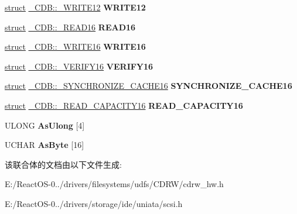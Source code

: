 \begin{DoxyCompactItemize}
\item 
\mbox{\label{union___c_d_b_a071f6d443af5e2df477b9142ffcf5545}} 
\hyperlink{interfacestruct}{struct} \hyperlink{struct___c_d_b_1_1___w_r_i_t_e12}{\+\_\+\+C\+D\+B\+::\+\_\+\+W\+R\+I\+T\+E12} {\bfseries W\+R\+I\+T\+E12}
\item 
\mbox{\label{union___c_d_b_afe8a3fa473179a065ae179190a4a9c5d}} 
\hyperlink{interfacestruct}{struct} \hyperlink{struct___c_d_b_1_1___r_e_a_d16}{\+\_\+\+C\+D\+B\+::\+\_\+\+R\+E\+A\+D16} {\bfseries R\+E\+A\+D16}
\item 
\mbox{\label{union___c_d_b_a0a8fa7a540f092dd2d0dcfbd810b7f6a}} 
\hyperlink{interfacestruct}{struct} \hyperlink{struct___c_d_b_1_1___w_r_i_t_e16}{\+\_\+\+C\+D\+B\+::\+\_\+\+W\+R\+I\+T\+E16} {\bfseries W\+R\+I\+T\+E16}
\item 
\mbox{\label{union___c_d_b_a0757143182e5d5281ce912935282b0e0}} 
\hyperlink{interfacestruct}{struct} \hyperlink{struct___c_d_b_1_1___v_e_r_i_f_y16}{\+\_\+\+C\+D\+B\+::\+\_\+\+V\+E\+R\+I\+F\+Y16} {\bfseries V\+E\+R\+I\+F\+Y16}
\item 
\mbox{\label{union___c_d_b_acc37e4e85c413db966c97a0553fea522}} 
\hyperlink{interfacestruct}{struct} \hyperlink{struct___c_d_b_1_1___s_y_n_c_h_r_o_n_i_z_e___c_a_c_h_e16}{\+\_\+\+C\+D\+B\+::\+\_\+\+S\+Y\+N\+C\+H\+R\+O\+N\+I\+Z\+E\+\_\+\+C\+A\+C\+H\+E16} {\bfseries S\+Y\+N\+C\+H\+R\+O\+N\+I\+Z\+E\+\_\+\+C\+A\+C\+H\+E16}
\item 
\mbox{\label{union___c_d_b_ac5e02a5713a9aacc5c2f4e73cfe22d70}} 
\hyperlink{interfacestruct}{struct} \hyperlink{struct___c_d_b_1_1___r_e_a_d___c_a_p_a_c_i_t_y16}{\+\_\+\+C\+D\+B\+::\+\_\+\+R\+E\+A\+D\+\_\+\+C\+A\+P\+A\+C\+I\+T\+Y16} {\bfseries R\+E\+A\+D\+\_\+\+C\+A\+P\+A\+C\+I\+T\+Y16}
\item 
\mbox{\label{union___c_d_b_a8404f9e84d8b5d4b40ad6c5f8ec32b7e}} 
U\+L\+O\+NG {\bfseries As\+Ulong} \mbox{[}4\mbox{]}
\item 
\mbox{\label{union___c_d_b_a0e099bd63525564df92d71ec188dd682}} 
U\+C\+H\+AR {\bfseries As\+Byte} \mbox{[}16\mbox{]}
\end{DoxyCompactItemize}


该联合体的文档由以下文件生成\+:\begin{DoxyCompactItemize}
\item 
E\+:/\+React\+O\+S-\/0../drivers/filesystems/udfs/\+C\+D\+R\+W/cdrw\+\_\+hw.\+h\item 
E\+:/\+React\+O\+S-\/0../drivers/storage/ide/uniata/scsi.\+h\end{DoxyCompactItemize}
